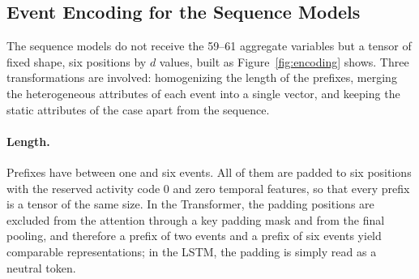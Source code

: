 \subsection{Event Encoding for the Sequence Models}
\label{sec:encoding}

The sequence models do not receive the 59--61 aggregate variables but a tensor of fixed shape, six positions by $d$ values, built as Figure~\ref{fig:encoding} shows. Three transformations are involved: homogenizing the length of the prefixes, merging the heterogeneous attributes of each event into a single vector, and keeping the static attributes of the case apart from the sequence.

\paragraph{Length.} Prefixes have between one and six events. All of them are padded to six positions with the reserved activity code 0 and zero temporal features, so that every prefix is a tensor of the same size. In the Transformer, the padding positions are excluded from the attention through a key padding mask and from the final pooling, and therefore a prefix of two events and a prefix of six events yield comparable representations; in the LSTM, the padding is simply read as a neutral token.

